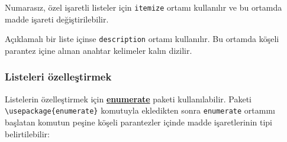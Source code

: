 \documentclass[
  letterpaper,
  DIV=11,
  numbers=noendperiod]{scrreprt}
\newenvironment{Shaded}{\begin{snugshade}}{\end{snugshade}}
\newcommand{\BuiltInTok}[1]{\textcolor[rgb]{0.00,0.23,0.31}{#1}}
\newcommand{\ExtensionTok}[1]{\textcolor[rgb]{0.00,0.23,0.31}{#1}}
\newcommand{\FunctionTok}[1]{\textcolor[rgb]{0.28,0.35,0.67}{#1}}
\newcommand{\KeywordTok}[1]{\textcolor[rgb]{0.00,0.23,0.31}{#1}}
\newcommand{\NormalTok}[1]{\textcolor[rgb]{0.00,0.23,0.31}{#1}}
\newcommand{\SpecialCharTok}[1]{\textcolor[rgb]{0.37,0.37,0.37}{#1}}
\newcommand{\SpecialStringTok}[1]{\textcolor[rgb]{0.13,0.47,0.30}{#1}}
\begin{document}
Numarasız, özel işaretli listeler için \texttt{itemize} ortamı
kullanılır ve bu ortamda madde işareti değiştirilebilir.

Açıklamalı bir liste içinse \texttt{description} ortamı kullanılır. Bu
ortamda köşeli parantez içine alınan anahtar kelimeler kalın dizilir.

\begin{Shaded}
\end{Shaded}

\hypertarget{listeleri-uxf6zelleux15ftirmek}{%
\subsubsection{Listeleri
özelleştirmek}\label{listeleri-uxf6zelleux15ftirmek}}

Listelerin özelleştirmek için
\href{http://ftp.ntua.gr/mirror/ctan/macros/latex/required/tools/enumerate.pdf}{\textbf{enumerate}}
paketi kullanılabilir. Paketi
\texttt{\textbackslash{}usepackage\{enumerate\}} komutuyla ekledikten
sonra \texttt{enumerate} ortamını başlatan komutun peşine köşeli
parantezler içinde madde işaretlerinin tipi belirtilebilir:
\end{document}
